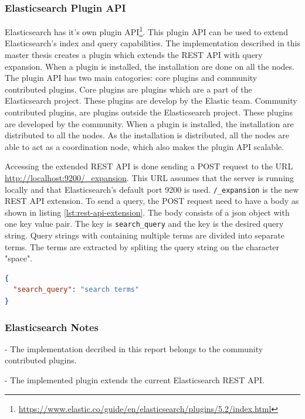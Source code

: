 \subsubsection{Elasticsearch Plugin API}
Elasticsearch has it's own plugin API\footnote{\url{https://www.elastic.co/guide/en/elasticsearch/plugins/5.2/index.html}}.
This plugin API can be used to extend Elasticsearch's index and query capabilities.
The implementation described in this master thesis creates a plugin which extends the REST API with query expansion.
When a plugin is installed, the installation are done on all the nodes.
The plugin API has two main catogories: core plugins and community contributed plugins.
Core plugins are plugins which are a part of the Elasticsearch project.
These plugins are develop by the Elastic team.
Community contributed plugins, are plugins outside the Elasticsearch project.
These plugins are developed by the community.
When a plugin is installed,
the installation are distributed to all the nodes.
As the installation is distributed,
all the nodes are able to act as a coordination node,
which also makes the plugin API scalable.

Accessing the extended REST API is done sending a POST request to the URL \url{http://localhost:9200/_expansion}.
This URL assumes that the server is running locally and that Elasticsearch's default port 9200 is used.
\texttt{/\_expansion} is the new REST API extension.
To send a query, the POST request need to have a body as shown in listing \ref{lst:rest-api-extension}.
The body consists of a json object with one key value pair.
The key is \texttt{search\_query} and the key is the desired query string.
Query strings with containing multiple terms are divided into separate terms.
The terms are extracted by spliting the query string on the character "space".

\begin{lstlisting}[language=json, caption={The POST request body for the implemented query expansion.}, label={lst:rest-api-extension}]
{
  "search_query": "search terms"
}
\end{lstlisting}

\subsubsection{Elasticsearch Notes}
- The implementation decribed in this report belongs to the community contributed plugins.

- The implemented plugin extends the current Elasticsearch REST API.

